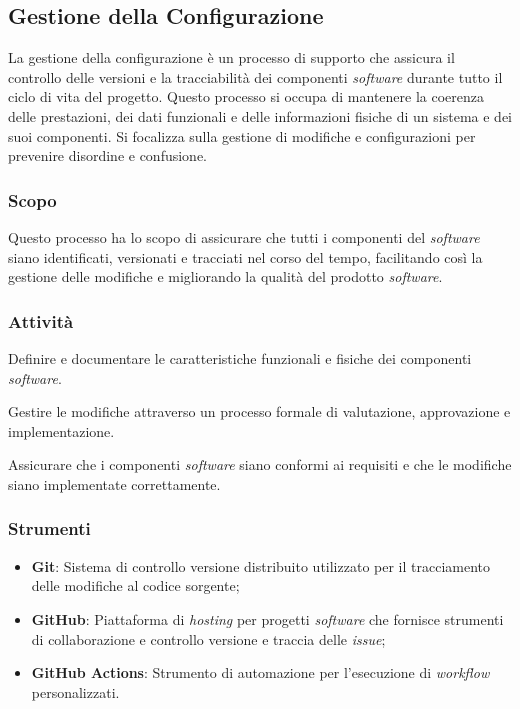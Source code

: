 \subsection{Gestione della Configurazione}

La gestione della configurazione è un processo di supporto che assicura il
controllo delle versioni e la tracciabilità dei componenti \textit{software}
durante tutto il ciclo di vita del progetto.
Questo processo si occupa di mantenere la coerenza delle prestazioni, dei dati
funzionali e delle informazioni fisiche di un sistema e dei suoi componenti.
Si focalizza sulla gestione di modifiche e configurazioni per prevenire
disordine e confusione.

\subsubsection{Scopo}
Questo processo ha lo scopo di assicurare che tutti i componenti del
\textit{software} siano identificati, versionati e tracciati nel corso del
tempo, facilitando così la gestione delle modifiche e migliorando la qualità
del prodotto \textit{software}.

\subsubsection{Attività}
Definire e documentare le caratteristiche funzionali e fisiche dei componenti
  \textit{software}.

Gestire le modifiche attraverso un processo formale di valutazione, approvazione 
e implementazione.



Assicurare che i componenti \textit{software} siano conformi ai requisiti e che 
le modifiche siano implementate correttamente.

\subsubsection{Strumenti}
\begin{itemize}
	\item \textbf{Git}: Sistema di controllo versione distribuito utilizzato per
	      il tracciamento delle modifiche al codice sorgente;
	\item \textbf{GitHub\g}: Piattaforma di \textit{hosting} per progetti \textit{software}
	      che fornisce strumenti di collaborazione e controllo versione e
	      traccia delle \textit{issue\g};
	\item \textbf{GitHub Actions}: Strumento di automazione per l'esecuzione di
	      \textit{workflow} personalizzati.
\end{itemize}
